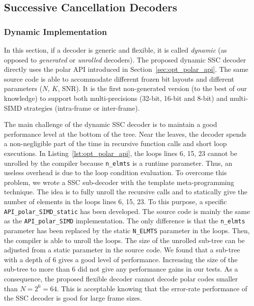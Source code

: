 \subsection{Successive Cancellation Decoders}
\label{sec:opt_polar_sc}

\subsubsection{Dynamic Implementation}

In this section, if a decoder is generic and flexible, it is called
\emph{dynamic} (as opposed to \emph{generated} or \emph{unrolled} decoders). The
proposed dynamic SSC decoder directly uses the polar API introduced in
Section~\ref{sec:opt_polar_api}. The same source code is able to accommodate
different frozen bit layouts and different parameters ($N$, $K$, SNR). It is the
first non-generated version (to the best of our knowledge) to support both
multi-precisions (32-bit, 16-bit and 8-bit) and multi-SIMD strategies
(intra-frame or inter-frame).

The main challenge of the dynamic SSC decoder is to maintain a good performance
level at the bottom of the tree. Near the leaves, the decoder spends a
non-negligible part of the time in recursive function calls and short loop
executions. In Listing~\ref{lst:opt_polar_api}, the loops lines 6, 15, 23 cannot
be unrolled by the compiler because \verb|n_elmts| is a runtime parameter. Thus,
an useless overhead is due to the loop condition evaluation. To overcome this
problem, we wrote a SSC sub-decoder with the template meta-programming
technique. The idea is to fully unroll the recursive calls and to statically
give the number of elements in the loops lines 6, 15, 23. To this purpose, a
specific \verb|API_polar_SIMD_static| has been developed. The source code is
mainly the same as the \verb|API_polar_SIMD| implementation. The only difference
is that the \verb|n_elmts| parameter has been replaced by the static
\verb|N_ELMTS| parameter in the loops. Then, the compiler is able to unroll
the loops. The size of the unrolled sub-tree can be adjusted from a static
parameter in the source code. We found that a sub-tree with a depth of 6 gives
a good level of performance. Increasing the size of the sub-tree to more than 6
did not give any performance gains in our tests. As a consequence, the proposed
flexible decoder cannot decode polar codes smaller than $N = 2^6 = 64$. This is
acceptable knowing that the error-rate performance of the SSC decoder is good
for large frame sizes.

